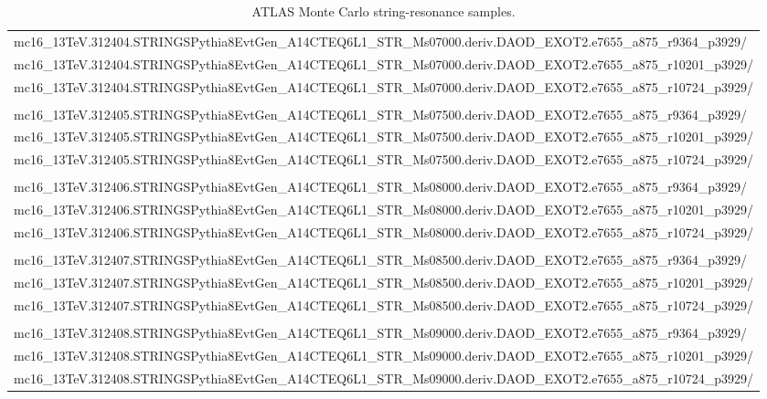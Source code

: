 \begin{sidewaystable}[p]
\begin{small}
\begin{tabular}{l}
\hline
mc16\_13TeV.312404.STRINGSPythia8EvtGen\_A14CTEQ6L1\_STR\_Ms07000.deriv.DAOD\_EXOT2.e7655\_a875\_r9364\_p3929/\\
mc16\_13TeV.312404.STRINGSPythia8EvtGen\_A14CTEQ6L1\_STR\_Ms07000.deriv.DAOD\_EXOT2.e7655\_a875\_r10201\_p3929/\\
mc16\_13TeV.312404.STRINGSPythia8EvtGen\_A14CTEQ6L1\_STR\_Ms07000.deriv.DAOD\_EXOT2.e7655\_a875\_r10724\_p3929/\\
\\
mc16\_13TeV.312405.STRINGSPythia8EvtGen\_A14CTEQ6L1\_STR\_Ms07500.deriv.DAOD\_EXOT2.e7655\_a875\_r9364\_p3929/\\
mc16\_13TeV.312405.STRINGSPythia8EvtGen\_A14CTEQ6L1\_STR\_Ms07500.deriv.DAOD\_EXOT2.e7655\_a875\_r10201\_p3929/\\
mc16\_13TeV.312405.STRINGSPythia8EvtGen\_A14CTEQ6L1\_STR\_Ms07500.deriv.DAOD\_EXOT2.e7655\_a875\_r10724\_p3929/\\
\\
mc16\_13TeV.312406.STRINGSPythia8EvtGen\_A14CTEQ6L1\_STR\_Ms08000.deriv.DAOD\_EXOT2.e7655\_a875\_r9364\_p3929/\\
mc16\_13TeV.312406.STRINGSPythia8EvtGen\_A14CTEQ6L1\_STR\_Ms08000.deriv.DAOD\_EXOT2.e7655\_a875\_r10201\_p3929/\\
mc16\_13TeV.312406.STRINGSPythia8EvtGen\_A14CTEQ6L1\_STR\_Ms08000.deriv.DAOD\_EXOT2.e7655\_a875\_r10724\_p3929/\\
\\
mc16\_13TeV.312407.STRINGSPythia8EvtGen\_A14CTEQ6L1\_STR\_Ms08500.deriv.DAOD\_EXOT2.e7655\_a875\_r9364\_p3929/\\
mc16\_13TeV.312407.STRINGSPythia8EvtGen\_A14CTEQ6L1\_STR\_Ms08500.deriv.DAOD\_EXOT2.e7655\_a875\_r10201\_p3929/\\
mc16\_13TeV.312407.STRINGSPythia8EvtGen\_A14CTEQ6L1\_STR\_Ms08500.deriv.DAOD\_EXOT2.e7655\_a875\_r10724\_p3929/\\
\\
mc16\_13TeV.312408.STRINGSPythia8EvtGen\_A14CTEQ6L1\_STR\_Ms09000.deriv.DAOD\_EXOT2.e7655\_a875\_r9364\_p3929/\\
mc16\_13TeV.312408.STRINGSPythia8EvtGen\_A14CTEQ6L1\_STR\_Ms09000.deriv.DAOD\_EXOT2.e7655\_a875\_r10201\_p3929/\\
mc16\_13TeV.312408.STRINGSPythia8EvtGen\_A14CTEQ6L1\_STR\_Ms09000.deriv.DAOD\_EXOT2.e7655\_a875\_r10724\_p3929/\\
\hline
\end{tabular}
\end{small}
\caption{ATLAS Monte Carlo string-resonance samples.}
\label{tab4}
\end{sidewaystable}


